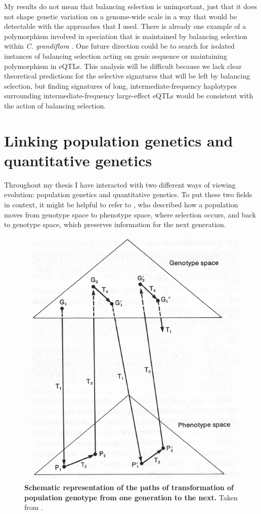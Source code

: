 My results do not mean that balancing selection is unimportant, just that it does not shape genetic variation on a genome-wide scale in a way that would be detectable with the approaches that I used. There is already one example of a polymorphism involved in speciation that is maintained by balancing selection within \textit{C. grandiflora} \citep{Sicard2015-uc}. One future direction could be to search for isolated instances of balancing selection acting on genic sequence or maintaining polymorphism in eQTLs. This analysis will be difficult because we lack clear theoretical predictions for the selective signatures that will be left by balancing selection, but finding signatures of long, intermediate-frequency haplotypes surrounding intermediate-frequency large-effect eQTLs would be consistent with the action of balancing selection.

\section{Linking population genetics and quantitative genetics}

Throughout my thesis I have interacted with two different ways of viewing evolution: population genetics and quantitative genetics. To put these two fields in context, it might be helpful to refer to \citet{lewontin1974}, who described how a population moves from genotype space to phenotype space, where selection occurs, and back to genotype space, which preserves information for the next generation.


\begin{figure}[ht!]
      \centering
       \includegraphics[scale=0.8]{figure_no_caption}
    \caption{\textbf{Schematic representation of the paths of transformation of population genotype from one generation to the next.} Taken from \citet{lewontin1974}.}
    \label{fig:lew}
\end{figure}

